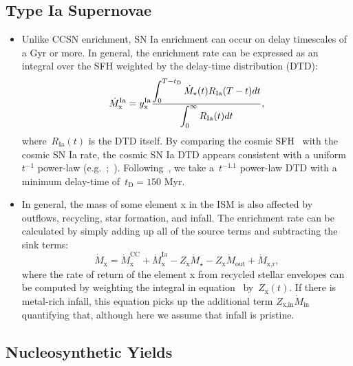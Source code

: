 \documentclass[ms.tex]{subfiles}
\begin{document}
\subsection{Type Ia Supernovae}
\label{sec:onezone:sneia}

\begin{itemize}

	\item Unlike CCSN enrichment, SN Ia enrichment can occur on delay
	timescales of a Gyr or more.
	In general, the enrichment rate can be expressed as an integral over the
	SFH weighted by the delay-time distribution (DTD):
	\begin{equation}
	\dot{M}_\text{x}^\text{Ia} = y_\text{x}^\text{Ia} \frac{\displaystyle{
		\int_0^{T - t_\text{D}} \dot{M}_\star(t) R_\text{Ia}(T - t) dt
	}}{\displaystyle{
		\int_0^\infty R_\text{Ia}(t) dt
	}},
	\end{equation}
	where~$R_\text{Ia}(t)$ is the DTD itself.
	By comparing the cosmic SFH~\citep[e.g.][]{Madau2014} with the cosmic SN
	Ia rate, the cosmic SN Ia DTD appears consistent with a uniform~$t^{-1}$
	power-law (e.g.~\citealp{Maoz2012a};~\citealp*{Maoz2012b, Graur2013}).
	Following~\citet{Weinberg2017}, we take a~$t^{-1.1}$ power-law DTD with a
	minimum delay-time of~$t_\text{D} = 150$ Myr.

	\item In general, the mass of some element x in the ISM is also affected by
	outflows, recycling, star formation, and infall.
	The enrichment rate can be calculated by simply adding up all of the source
	terms and subtracting the sink terms:
	\begin{equation}
	\label{eq:enrichment_eq}
	\dot{M}_\text{x} = \dot{M}_\text{x}^\text{CC} + \dot{M}_\text{x}^\text{Ia}
	- Z_\text{x}\dot{M}_\star - Z_\text{x}\dot{M}_\text{out} +
	\dot{M}_\text{x,r},
	\end{equation}
	where the rate of return of the element x from recycled stellar envelopes
	can be computed by weighting the integral in equation~
	by~$Z_\text{x}(t)$.
	If there is metal-rich infall, this equation picks up the additional term
	$Z_\text{x,in}\dot{M}_\text{in}$ quantifying that, although here we assume
	that infall is pristine.

\end{itemize}

\subsection{Nucleosynthetic Yields}
\label{sec:onezone:yields}
\end{document}

